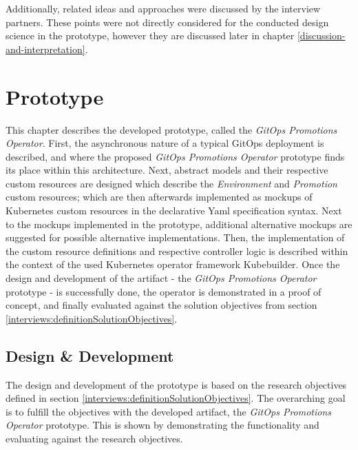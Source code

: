 Additionally,
related ideas and approaches were discussed by the interview partners.
These points were not directly considered for the conducted design science in the prototype,
however they are discussed later in chapter \ref{discussion-and-interpretation}.
















\chapter{Prototype}
\label{chapter:prototype}

This chapter describes the developed prototype,
called the \textit{GitOps Promotions Operator}.
First, the asynchronous nature of a typical GitOps deployment is described,
and where the proposed \textit{GitOps Promotions Operator} prototype finds its place within
this architecture.
Next, abstract models and their respective custom resources are designed which describe the \textit{Environment} and \textit{Promotion} 
custom resources; which are then afterwards implemented as mockups of 
Kubernetes custom resources in the declarative Yaml specification syntax.
Next to the mockups implemented in the prototype,
additional alternative mockups are suggested for possible alternative implementations.
Then, the implementation of the custom resource definitions and respective controller logic
is described within the context of the used Kubernetes operator framework Kubebuilder.
Once the design and development of the artifact - the \textit{GitOps Promotions Operator} prototype -
is successfully done,
the operator is demonstrated in a proof of concept,
and finally evaluated against the solution objectives
from section \ref{interviews:definitionSolutionObjectives}.

\section{Design \& Development}

The design and development of the prototype
is based on the research objectives defined in section
\ref{interviews:definitionSolutionObjectives}.
The overarching goal is to fulfill the objectives with the developed artifact,
the \textit{GitOps Promotions Operator} prototype.
This is shown by demonstrating the functionality and evaluating against the research objectives.

